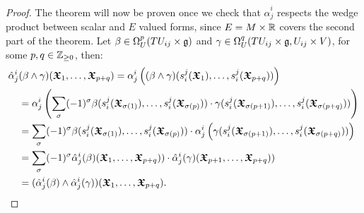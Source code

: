\begin{proof}
The theorem will now be proven once we check that $\hat \alpha^i_j$ respects the wedge product between scalar and $E$ valued forms, since $E = M \times \mathbb{R}$ covers the second part of the theorem. Let $\beta \in \Omega^p_U(TU_{ij}\times \mathfrak{g})$ and $\gamma \in \Omega^q_U(TU_{ij}\times \mathfrak{g}, U_{ij} \times V)$, for some $p, q \in \mathbb{Z}_{\geq 0}$, then:
\begin{align*}
    \hat \alpha^i_j&(\beta \wedge \gamma)(\bm{\mathfrak{X}}_1, \dots, \bm{\mathfrak{X}}_{p+q}) 
    = \alpha^i_j\left( (\beta \wedge \gamma)(s^j_i(\bm{\mathfrak{X}}_1), \dots, s^j_i(\bm{\mathfrak{X}}_{p+q})) \right) \\
    &= \alpha^i_j\left( \sum_{\sigma}(-1)^\sigma \beta(s^j_i(\bm{\mathfrak{X}}_{\sigma(1)}), \dots, s^j_i(\bm{\mathfrak{X}}_{\sigma(p)})) \cdot \gamma(s^j_i(\bm{\mathfrak{X}}_{\sigma(p+1)}), \dots, s^j_i(\bm{\mathfrak{X}}_{\sigma(p+q)})) \right) \\
    &=  \sum_{\sigma}(-1)^\sigma \beta(s^j_i(\bm{\mathfrak{X}}_{\sigma(1)}), \dots, s^j_i(\bm{\mathfrak{X}}_{\sigma(p)})) \cdot \alpha^i_j\left(\gamma(s^j_i(\bm{\mathfrak{X}}_{\sigma(p+1)}), \dots, s^j_i(\bm{\mathfrak{X}}_{\sigma(p+q)}))\right) \\
    &= \sum_{\sigma}(-1)^\sigma \hat \alpha^i_j(\beta)(\bm{\mathfrak{X}}_1, \dots, \bm{\mathfrak{X}}_{p+q})) \cdot \hat \alpha^i_j(\gamma)(\bm{\mathfrak{X}}_{p+1}, \dots, \bm{\mathfrak{X}}_{p+q}))\\
    &= (\hat \alpha^i_j(\beta) \wedge \hat \alpha^i_j(\gamma))(\bm{\mathfrak{X}}_1, \dots, \bm{\mathfrak{X}}_{p+q}).
\end{align*}

\end{proof}

